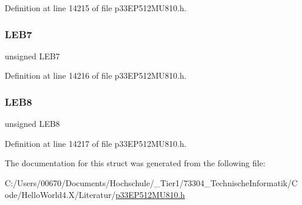 Definition at line 14215 of file p33\+E\+P512\+M\+U810.\+h.

\mbox{\label{structtag_l_e_b_d_l_y1_b_i_t_s_aa76d586b04119d8459718019ddd964ef}} 
\subsubsection{\texorpdfstring{L\+E\+B7}{LEB7}}
{\footnotesize\ttfamily unsigned L\+E\+B7}



Definition at line 14216 of file p33\+E\+P512\+M\+U810.\+h.

\mbox{\label{structtag_l_e_b_d_l_y1_b_i_t_s_a9b22b47001301c6ae00c3eea0f385091}} 
\subsubsection{\texorpdfstring{L\+E\+B8}{LEB8}}
{\footnotesize\ttfamily unsigned L\+E\+B8}



Definition at line 14217 of file p33\+E\+P512\+M\+U810.\+h.



The documentation for this struct was generated from the following file\+:\begin{DoxyCompactItemize}
\item 
C\+:/\+Users/00670/\+Documents/\+Hochschule/\+\_\+\+Tier1/73304\+\_\+\+Technische\+Informatik/\+Code/\+Hello\+World4.\+X/\+Literatur/\hyperlink{p33_e_p512_m_u810_8h}{p33\+E\+P512\+M\+U810.\+h}\end{DoxyCompactItemize}
